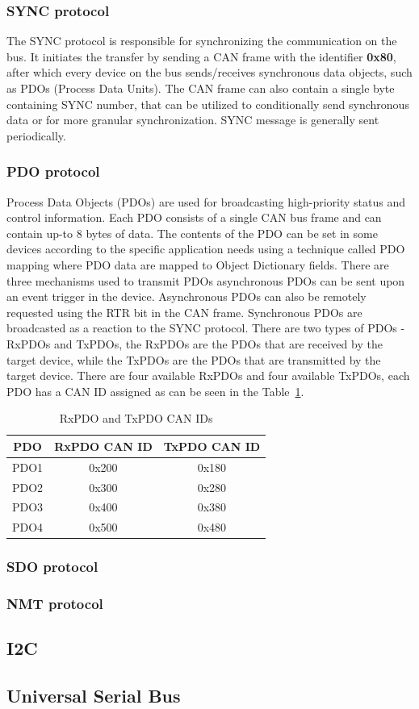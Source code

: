 \subsubsection{SYNC protocol}
The SYNC protocol is responsible for synchronizing the communication on the bus.
It initiates the transfer by sending a CAN frame with the identifier \textbf{0x80}, after which every device on the bus sends/receives synchronous data objects, such as PDOs (Process Data Units).
The CAN frame can also contain a single byte containing SYNC number, that can be utilized to conditionally send synchronous data or for more granular synchronization\cite{cia}.
SYNC message is generally sent periodically.

\subsubsection{PDO protocol}
Process Data Objects (PDOs) are used for broadcasting high-priority status and control information\cite{cia}.
Each PDO consists of a single CAN bus frame and can contain up-to 8 bytes of data.
The contents of the PDO can be set in some devices according to the specific application needs using a technique called PDO mapping where PDO data are mapped to Object Dictionary fields.
There are three mechanisms used to transmit PDOs asynchronous PDOs can be sent upon an event trigger in the device.
Asynchronous PDOs can also be remotely requested using the RTR bit in the CAN frame.
Synchronous PDOs are broadcasted as a reaction to the SYNC protocol.
There are two types of PDOs - RxPDOs and TxPDOs, the RxPDOs are the PDOs that are received by the target device, while the TxPDOs are the PDOs that are transmitted by the target device.
There are four available RxPDOs and four available TxPDOs, each PDO has a CAN ID assigned as can be seen in the Table~\ref{tab:pdo}.

\begin{table}[H]
    \centering
    \begin{tabular}{ |c|c|c| }
        \hline
        PDO & RxPDO CAN ID & TxPDO CAN ID \\
        \hline
        \hline
        PDO1 & 0x200 & 0x180 \\
        \hline
        PDO2 & 0x300 & 0x280 \\
        \hline
        PDO3 & 0x400 & 0x380 \\
        \hline
        PDO4 & 0x500 & 0x480 \\
        \hline
    \end{tabular}
    \caption{RxPDO and TxPDO CAN IDs\cite{wiki_canopen}}
    \label{tab:pdo}
\end{table}

\subsubsection{SDO protocol}

\subsubsection{NMT protocol}

\subsection{I2C}
\label{subsec:i2c}

\subsection{Universal Serial Bus}
\label{subsec:usb}
